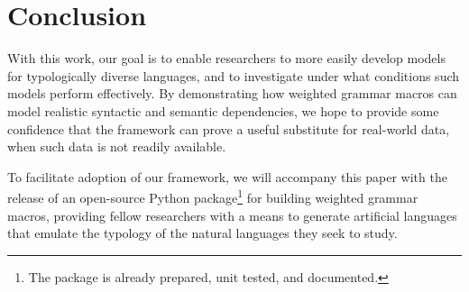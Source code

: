\documentclass[11pt,a4paper]{article}
\begin{document}
\section{Conclusion}

With this work, our goal is to enable researchers to more easily develop models for typologically diverse languages, and to investigate under what conditions such models perform effectively. By demonstrating how weighted grammar macros can model realistic syntactic and semantic dependencies, we hope to provide some confidence that the framework can prove a useful substitute for real-world data, when such data is not readily available.

To facilitate adoption of our framework, we will accompany this paper with the release of an open-source Python package\footnote{The package is already prepared, unit tested, and documented.} for building weighted grammar macros, providing fellow researchers with a means to generate artificial languages that emulate the typology of the natural languages they seek to study. 











\appendix
\end{document}
